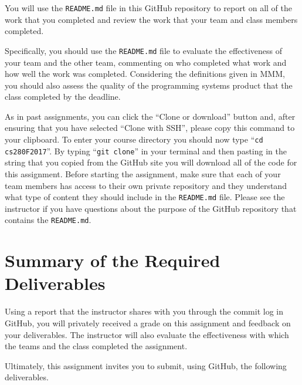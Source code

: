 \documentclass[11pt]{article}
\newcommand{\reflection}{\lstinline{README.md}}
\newcommand{\command}[1]{``\lstinline{#1}''}
\begin{document}
You will use the \reflection{} file in this GitHub repository to report on all of the work that you completed and review
the work that your team and class members completed.

Specifically, you should use the \reflection{} file to evaluate the
effectiveness of your team and the other team, commenting on who completed what work and how well the work was
completed. Considering the definitions given in MMM, you should also assess the quality of the programming systems
product that the class completed by the deadline.


As in past assignments, you can click the ``Clone or download'' button
and, after ensuring that you have selected ``Clone with SSH'', please copy this command to your clipboard. To enter your
course directory you should now type \command{cd cs280F2017}. By typing \command{git clone} in your terminal and then
pasting in the string that you copied from the GitHub site you will download all of the code for this assignment. Before
starting the assignment, make sure that each of your team members has access to their own private repository and they
understand what type of content they should include in the \reflection{} file. Please see the instructor if you have
questions about the purpose of the GitHub repository that contains the \reflection{}.






\section*{Summary of the Required Deliverables}

Using a report that the instructor shares with you through the commit log in GitHub, you will privately received a grade
on this assignment and feedback on your deliverables. The instructor will also evaluate the effectiveness with which the
teams and the class completed the assignment.

\vspace*{-.5em}


Ultimately, this assignment invites you to submit, using GitHub, the following deliverables.

\vspace*{-.5em}
\end{document}
